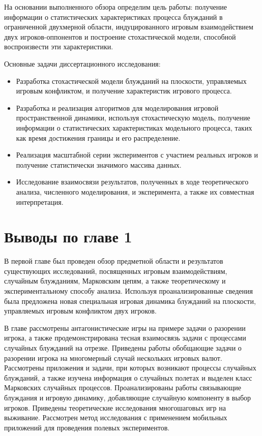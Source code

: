 На основании выполненного обзора определим цель работы: получение информации о статистических характеристиках процесса блужданий в ограниченной двухмерной области, индуцированного игровым взаимодействием двух игроков-оппонентов и построение стохастической модели, способной воспроизвести эти характеристики.

Основные задачи диссертационного исследования:
\begin{itemize}
    \item Разработка стохастической модели блужданий на плоскости, управляемых игровым конфликтом, и получение характеристик игрового процесса.
    \item Разработка и реализация алгоритмов для моделирования игровой пространственной динамики, используя стохастическую модель, получение информации о статистических характеристиках модельного процесса, таких как время достижения границы и его распределение.
    \item Реализация масштабной серии экспериментов с участием реальных игроков и получение статистически значимого массива данных.
    \item Исследование взаимосвязи результатов, полученных в ходе теоретического анализа, численного моделирования, и эксперимента, а также их совместная интерпретация.
\end{itemize}

\section{Выводы по главе 1}\label{sec:ch1/sec5}

В первой главе был проведен обзор предметной области и результатов существующих исследований, посвященных игровым взаимодействиям, случайным блужданиям, Марковским цепям, а также теоретическому и экспериментальному способу анализа. Используя проанализированные сведения была предложена новая специальная игровая динамика блужданий на плоскости, управляемых игровым конфликтом двух игроков.

В главе рассмотрены антагонистические игры на примере задачи о разорении игрока, а также продемонстрирована тесная взаимосвязь задачи с процессами случайных блужданий на отрезке. Приведены работы обобщающие задачи о разорении игрока на многомерный случай нескольких игровых валют. Рассмотрены приложения и задачи, при которых возникают процессы случайных блужданий, а также изучена информация о случайных полетах и выделен класс Марковских случайных процессов. Проанализированы работы связывающие блуждания и игровую динамику, добавляющие случайную компоненту в выбор игроков. Приведены теоретические исследования многошаговых игр на выживание. Рассмотрен метод исследования с применением мобильных приложений для проведения полевых экспериментов.

